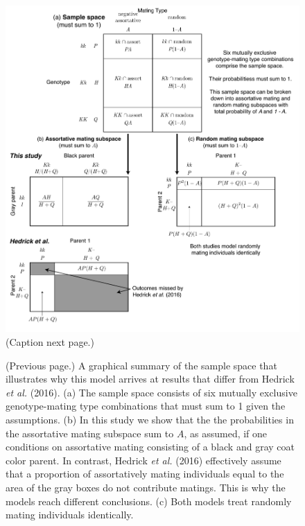 \documentclass[
]{article}
\begin{document}
\begin{figure}[ht]
  \centering
  \includegraphics[width=\textwidth]{../figures/sample-space.pdf}
  \caption{(Caption next page.)}
  \label{fig:sample-space}
\end{figure}
\addtocounter{figure}{-1}

\begin{figure} [t!]
\caption{(Previous page.) A graphical summary of the sample space that illustrates why this model arrives at results that differ from Hedrick \textit{et al.} (2016). (a) The sample space consists of six mutually exclusive genotype-mating type combinations that must sum to 1 given the assumptions. (b) In this study we show that the the probabilities in the assortative mating subspace sum to $A$, as assumed, if one conditions on assortative mating consisting of a black and gray coat color parent. In contrast, Hedrick \textit{et al.} (2016) effectively assume that a proportion of assortatively mating individuals equal to the area of the gray boxes do not contribute matings. This is why the models reach different conclusions. (c) Both models treat randomly mating individuals identically.}
\end{figure}
\end{document}
